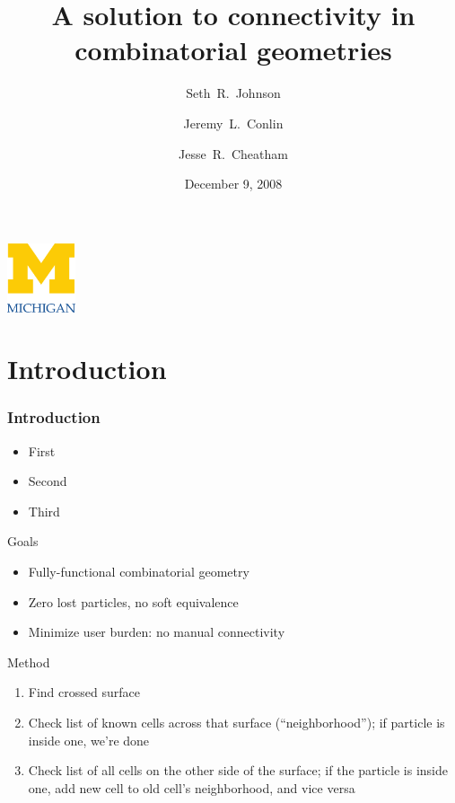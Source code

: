 \documentclass{beamer}
\title[MCGeometry]%
{A solution to connectivity in combinatorial geometries}
\author[SRJ, JLC, JRC]{Seth~R.~Johnson \and Jeremy~L.~Conlin \and Jesse~R.~Cheatham}
\institute[UM]{
University of Michigan, Ann Arbor
}
\date[Project presentation]{December 9, 2008}
\begin{document}

\begin{frame}
\titlepage
\begin{center}
  \includegraphics[width=2cm]{umlogo}
\end{center}
\end{frame}


\section{Introduction}
\begin{frame}
  \frametitle{Introduction}
  \begin{itemize}
  \item First
  \item Second
  \item Third
\end{itemize}
\end{frame}
\begin{frame}{Goals}
\begin{itemize}
  \item Fully-functional combinatorial geometry
  \item Zero lost particles, no soft equivalence
  \item Minimize user burden: no manual connectivity
\end{itemize}
\end{frame}
\begin{frame}{Method}
\begin{enumerate}
  \item Find crossed surface
  \item Check list of known cells across that surface (``neighborhood'');
    if particle is inside one, we're done
  \item Check list of all cells on the other side of the surface; if the
    particle is inside one, add new cell to old cell's neighborhood, and
    vice versa
\end{enumerate}
\end{frame}
\end{document}
